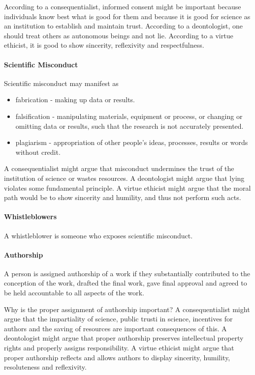 According to a consequentialist, informed consent might be important because individuals know best what is good for them and because it is good for science as an institution to establish and maintain trust. According to a deontologist, one should treat others as autonomous beings and not lie. According to a virtue ethicist, it is good to show sincerity, reflexivity and respectfulness.

\paragraph{Scientific Misconduct}
Scientific misconduct may manifest as
\begin{itemize}
	\item fabrication - making up data or results.
	\item falsification - manipulating materials, equipment or process, or changing or omitting data or results, such that the research is not accurately presented.
	\item plagiarism - appropriation of other people's ideas, processes, results or words without credit.
\end{itemize}

A consequentialist might argue that misconduct undermines the trust of the institution of science or wastes resources. A deontologist might argue that lying violates some fundamental principle. A virtue ethicist might argue that the moral path would be to show sincerity and humility, and thus not perform such acts.

\paragraph{Whistleblowers}
A whistleblower is someone who exposes scientific misconduct.

\paragraph{Authorship}
A person is assigned authorship of a work if they substantially contributed to the conception of the work, drafted the final work, gave final approval and agreed to be held accountable to all aspects of the work.

Why is the proper assignment of authorship important? A consequentialist might argue that the impartiality of science, public trusti in science, incentives for authors and the saving of resources are important consequences of this. A deontologist might argue that proper authorship preserves intellectual property rights and properly assigns responsibility. A virtue ethicist might argue that proper authorship reflects and allows authors to display sincerity, humility, resoluteness and reflexivity.

